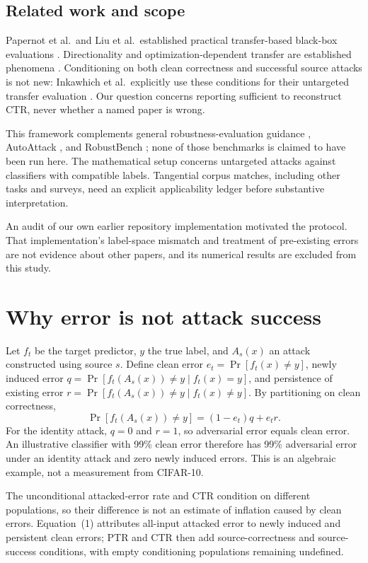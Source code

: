 \documentclass[10pt]{article}
\begin{document}
\subsection{Related work and scope}
\label{sec:background}
Papernot et al.\ and Liu et al.\ established practical transfer-based black-box evaluations \citep{papernot,liu}. Directionality and optimization-dependent transfer are established phenomena \citep{demontis,dong}. Conditioning on both clean correctness and successful source attacks is not new: Inkawhich et al.\ explicitly use these conditions for their untargeted transfer evaluation \citep{inkawhich2019}. Our question concerns reporting sufficient to reconstruct CTR, never whether a named paper is wrong.

This framework complements general robustness-evaluation guidance \citep{carlini2019,tramer2020}, AutoAttack \citep{croce2020}, and RobustBench \citep{robustbench}; none of those benchmarks is claimed to have been run here. The mathematical setup concerns untargeted attacks against classifiers with compatible labels. Tangential corpus matches, including other tasks and surveys, need an explicit applicability ledger before substantive interpretation.

An audit of our own earlier repository implementation motivated the protocol. That implementation's label-space mismatch and treatment of pre-existing errors are not evidence about other papers, and its numerical results are excluded from this study.

\section{Why error is not attack success}
Let $f_t$ be the target predictor, $y$ the true label, and $A_s(x)$ an attack constructed using source $s$. Define clean error $e_t=\Pr[f_t(x)\ne y]$, newly induced error $q=\Pr[f_t(A_s(x))\ne y\mid f_t(x)=y]$, and persistence of existing error $r=\Pr[f_t(A_s(x))\ne y\mid f_t(x)\ne y]$. By partitioning on clean correctness,
\begin{equation}
\Pr[f_t(A_s(x))\ne y]=(1-e_t)q+e_t r.
\end{equation}
For the identity attack, $q=0$ and $r=1$, so adversarial error equals clean error. An illustrative classifier with 99\% clean error therefore has 99\% adversarial error under an identity attack and zero newly induced errors. This is an algebraic example, not a measurement from CIFAR-10.

The unconditional attacked-error rate and CTR condition on different populations, so their difference is not an estimate of inflation caused by clean errors. Equation~(1) attributes all-input attacked error to newly induced and persistent clean errors; PTR and CTR then add source-correctness and source-success conditions, with empty conditioning populations remaining undefined.
\end{document}

